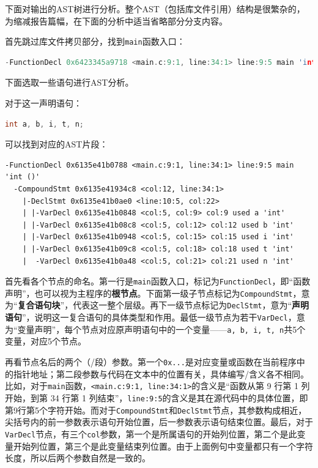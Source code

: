 \documentclass[UTF8,a4paper,10pt]{ctexart}
\begin{document}
下面对输出的AST树进行分析。整个AST（包括库文件引用）结构是很繁杂的，为缩减报告篇幅，在下面的分析中适当省略部分分支内容。

首先跳过库文件拷贝部分，找到\texttt{main}函数入口：
\begin{lstlisting}[frame=trbl,language={C++}]
-FunctionDecl 0x6423345a9718 <main.c:9:1, line:34:1> line:9:5 main 'int ()'
\end{lstlisting}

下面选取一些语句进行AST分析。

对于这一声明语句：
\begin{lstlisting}[frame=trbl,language={C++}]
    int a, b, i, t, n;
\end{lstlisting}
可以找到对应的AST片段：
\begin{lstlisting}[title=AST片段 1,frame=trbl]
-FunctionDecl 0x6135e41b0788 <main.c:9:1, line:34:1> line:9:5 main 'int ()'
  -CompoundStmt 0x6135e41934c8 <col:12, line:34:1>
    |-DeclStmt 0x6135e41b0ae0 <line:10:5, col:22>
    | |-VarDecl 0x6135e41b0848 <col:5, col:9> col:9 used a 'int'
    | |-VarDecl 0x6135e41b08c8 <col:5, col:12> col:12 used b 'int'
    | |-VarDecl 0x6135e41b0948 <col:5, col:15> col:15 used i 'int'
    | |-VarDecl 0x6135e41b09c8 <col:5, col:18> col:18 used t 'int'
    |  -VarDecl 0x6135e41b0a48 <col:5, col:21> col:21 used n 'int'
\end{lstlisting}

首先看各个节点的命名。第一行是\texttt{main}函数入口，标记为\texttt{FunctionDecl}，即“函数声明”，也可以视为主程序的\textbf{根节点}。下面第一级子节点标记为\texttt{CompoundStmt}，意为“\textbf{复合语句块}”，代表这一整个层级。再下一级节点标记为\texttt{DeclStmt}，意为“\textbf{声明语句}”，说明这一复合语句的具体类型和作用。最低一级节点为若干\texttt{VarDecl}，意为“变量声明”，每个节点对应原声明语句中的一个变量——\texttt{a, b, i, t, n}共5个变量，对应5个节点。

再看节点名后的两个（/段）参数。第一个\texttt{0x...}是对应变量或函数在当前程序中的指针地址；第二段参数与代码在文本中的位置有关，具体编写/含义各不相同。比如，对于\texttt{main}函数，\texttt{<main.c:9:1, line:34:1>}的含义是“函数从第 9 行第 1 列开始，到第 34 行第 1 列结束”，\texttt{line:9:5}的含义是其在源代码中的具体位置，即第9行第5个字符开始。而对于\texttt{CompoundStmt}和\texttt{DeclStmt}节点，其参数构成相近，尖括号内的前一参数表示语句开始位置，后一参数表示语句结束位置。最后，对于\texttt{VarDecl}节点，有三个\texttt{col}参数，第一个是所属语句的开始列位置，第二个是此变量开始列位置，第三个是此变量结束列位置。由于上面例句中变量都只有一个字符长度，所以后两个参数自然是一致的。
\end{document}

